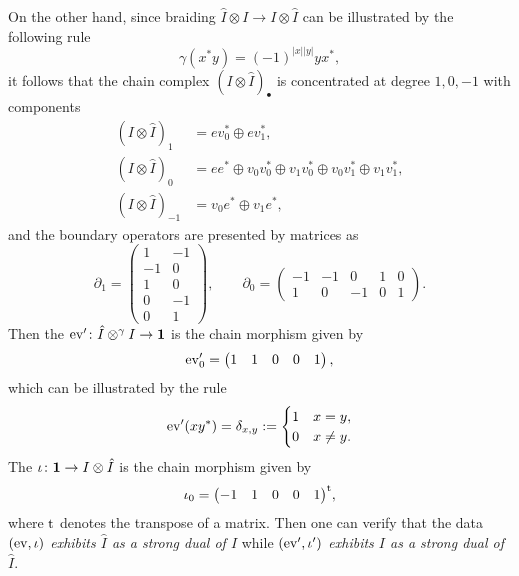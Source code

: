 {On the other hand, 
since braiding $\hat{I}\otimes I\to I\otimes\hat{I}$ can be 
illustrated by the following rule
\[
\gamma(x^{\ast}y) = (-1)^{|x||y|}yx^{\ast},
\]
it follows that 
the chain complex $(I\otimes\hat{I})_{\bullet}$ is 
concentrated at degree $1,0,-1$ with components
\begin{align*}
(I\otimes\hat{I})_{1} &= 
\unit{ev_0^{\ast}}\oplus\unit{ev_1^{\ast}}, \\
(I\otimes\hat{I})_{0} &= 
\unit{ee^{\ast}}\oplus
\unit{v_0v_0^{\ast}}\oplus\unit{v_1v_0^{\ast}}\oplus
\unit{v_0v_1^{\ast}}\oplus\unit{v_1v_1^{\ast}}, \\
(I\otimes\hat{I})_{-1} &= 
\unit{v_0e^{\ast}}\oplus\unit{v_1e^{\ast}},
\end{align*}
and the boundary operators are presented by matrices as
\[
\partial_1=
\begin{pmatrix}
1 & -1  \\
-1 & 0  \\
1 & 0  \\
0 & -1  \\
0 & 1 
\end{pmatrix},\qquad
\partial_0=
\begin{pmatrix}
-1 & -1 & 0 & 1 & 0 \\
1 & 0 & -1 & 0 & 1
\end{pmatrix}.
\]
Then the  
$\operatorname{ev}'\colon \hat{I}\otimes^{\gamma}I\to\mathbf{1}$ 
is the chain morphism given by 
\[
\operatorname{ev}'_0=
\begin{pmatrix}
1 & 1 & 0 & 0 & 1
\end{pmatrix},
\]
which can be illustrated by the rule
\[
\operatorname{ev}'(xy^{\ast})=\delta_{x,y}:=
\begin{cases}
1 & x=y,\\
0 & x\neq y.
\end{cases}
\]
The  
$\iota\colon \mathbf{1}\to I\otimes\hat{I}$ 
is the chain morphism given by 
\[
\iota_0=
{\begin{pmatrix}
-1 & 1 & 0 & 0 & 1
\end{pmatrix}}^{\rm t},
\]
where ${\rm t}$ denotes the transpose of a matrix. 
Then one can verify that the data
\emph{$(\operatorname{ev},\iota)$ exhibits $\hat{I}$ 
as a strong dual of $I$} while 
\emph{$(\operatorname{ev}',\iota')$ exhibits $I$ 
as a strong dual of $\hat{I}$}.
}
